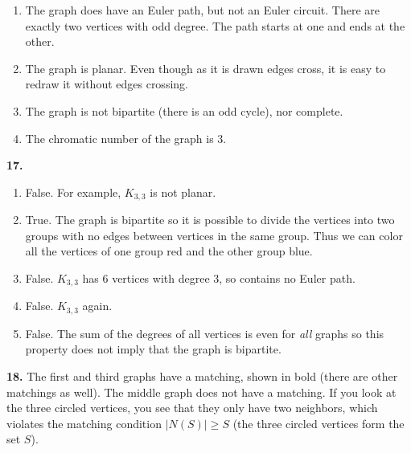 \documentclass[10pt,]{book}
\theoremstyle{plain}
\theoremstyle{definition}
\theoremstyle{definition}
\theoremstyle{definition}
\numberwithin{equation}{chapter}
\begin{document}
\begin{enumerate}[label=(\alph*)]
\item\hypertarget{li-1269}{}
                The graph does have an Euler path, but not an Euler circuit. There are exactly two vertices with odd degree. The path starts at one and ends at the other.
\item\hypertarget{li-1270}{}
                The graph is planar. Even though as it is drawn edges cross, it is easy to redraw it without edges crossing.
\item\hypertarget{li-1271}{}
                The graph is not bipartite (there is an odd cycle), nor complete.
\item\hypertarget{li-1272}{}
                The chromatic number of the graph is 3.
\end{enumerate}
\par\smallskip
\noindent\textbf{17.}\quad{}\leavevmode%
\begin{enumerate}[label=(\alph*)]
\item\hypertarget{li-1278}{}
                False. For example, \(K_{3,3}\) is not planar.
\item\hypertarget{li-1279}{}
                True. The graph is bipartite so it is possible to divide the vertices into two groups with no edges between vertices in the same group. Thus we can color all the vertices of one group red and the other group blue.
\item\hypertarget{li-1280}{}
                False. \(K_{3,3}\) has 6 vertices with degree 3, so contains no Euler path.
\item\hypertarget{li-1281}{}
                False. \(K_{3,3}\) again.
\item\hypertarget{li-1282}{}
                False. The sum of the degrees of all vertices is even for \emph{all} graphs so this property does not imply that the graph is bipartite.
\end{enumerate}
\par\smallskip
\noindent\textbf{18.}\quad{}
            The first and third graphs have a matching, shown in bold (there are other matchings as well). The middle graph does not have a matching. If you look at the three circled vertices, you see that they only have two neighbors, which violates the matching condition \(|N(S)| \ge S\) (the three circled vertices form the set \(S\)).
\par
\end{document}
